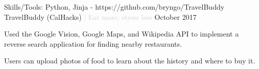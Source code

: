 \begin{cventries}
  \cventry
  {Skills/Tools: Python, Jinja - https://github.com/bryngo/TravelBuddy} %
  {TravelBuddy (CalHacks) \textcolor{lightgray}{| Eat more, stress less}} %
  {} %
  {October 2017} %
  {
  \begin{cvitems} %
    \item {Used the Google Vision, Google Maps, and Wikipedia API to implement a reverse search application for finding nearby restaurants.}
    \item {Users can upload photos of food to learn about the history and where to buy it.}
  \end{cvitems}
  }

\end{cventries}
